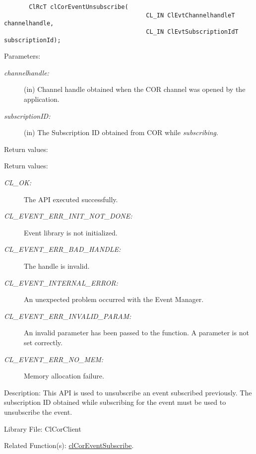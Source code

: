 \begin{flushleft}
\begin{Desc}
\footnotesize\begin{verbatim}       ClRcT clCorEventUnsubscribe(
                                		CL_IN ClEvtChannelhandleT channelhandle,
                                		CL_IN ClEvtSubscriptionIdT subscriptionId);
\end{verbatim}
\normalsize
\end{Desc}
\begin{Desc}
\item[Parameters:]
\begin{description}
\item[{\em channel\-handle:}](in) Channel handle obtained when the COR channel was opened by the application. 
\item[{\em subscription\-ID:}](in) The Subscription ID obtained from COR while \textit{subscribing}.
\end{description}
\end{Desc}
\begin{Desc}
\item[Return values:]\end{Desc}
\begin{Desc}
\item[Return values:]
\begin{description}
\item[{\em CL\_\-OK:}]The API executed successfully. 
 \item[{\em CL\_\-EVENT\_\-ERR\_\-INIT\_\-NOT\_\-DONE:}]Event library is not initialized. 
 \item[{\em CL\_\-EVENT\_\-ERR\_\-BAD\_\-HANDLE:}]The handle is invalid. 
 \item[{\em CL\_\-EVENT\_\-INTERNAL\_\-ERROR:}]An unexpected problem occurred with the Event Manager. 
 \item[{\em CL\_\-EVENT\_\-ERR\_\-INVALID\_\-PARAM:}]An invalid parameter has been passed to the function. A parameter is not set correctly. 
 \item[{\em CL\_\-EVENT\_\-ERR\_\-NO\_\-MEM:}]Memory allocation failure.\end{description}
\end{Desc}
\begin{Desc}
\item[Description:]This API is used to unsubscribe an event subscribed previously. The subscription ID obtained while subscribing for the event must be
used to unsubscribe the event. 
\end{Desc}
\begin{Desc}
\item[Library File:]Cl\-Cor\-Client\end{Desc}
\begin{Desc}
\item[Related Function(s):]\hyperlink{pagecor133}{cl\-Cor\-Event\-Subscribe}. \end{Desc}
\newpage





\end{flushleft}
